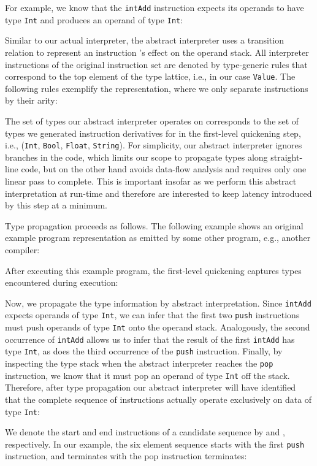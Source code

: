 \documentclass[preprint,10pt]{popl14conf}
\begin{document}
For example, we know that the \texttt{intAdd} instruction expects its operands to have type
\texttt{Int} and produces an operand of type \texttt{Int}:

Similar to our actual interpreter, the abstract interpreter uses a transition relation 
to represent an instruction 's effect on the operand stack.
All interpreter instructions of the original instruction set are denoted by type-generic rules that
correspond to the top element of the type lattice, i.e., in our case \texttt{Value}.
The following rules exemplify the representation, where we only separate instructions by their
arity:


The set of types our abstract interpreter operates on corresponds to the set of types we generated
instruction derivatives for in the first-level quickening step, i.e., (\texttt{Int}, \texttt{Bool},
\texttt{Float}, \texttt{String}).
For simplicity, our abstract interpreter ignores branches in the code, which limits our scope to
propagate types along straight-line code, but on the other hand avoids data-flow analysis and
requires only one linear pass to complete.
This is important insofar as we perform this abstract interpretation at run-time and therefore are
interested to keep latency introduced by this step at a minimum.

Type propagation proceeds as follows.
The following example shows an original example program representation as emitted by some other
program, e.g., another compiler:

After executing this example program, the first-level quickening captures types encountered during
execution:

Now, we propagate the type information by abstract interpretation.
Since \texttt{intAdd} expects operands of type \texttt{Int}, we can infer that the first two
\texttt{push} instructions must push operands of type \texttt{Int} onto the operand stack.
Analogously, the second occurrence of \texttt{intAdd} allows us to infer that the result of the
first \texttt{intAdd} has type \texttt{Int}, as does the third occurrence of the \texttt{push}
instruction.
Finally, by inspecting the type stack when the abstract interpreter reaches the \texttt{pop}
instruction, we know that it must pop an operand of type \texttt{Int} off the stack.
Therefore, after type propagation our abstract interpreter will have identified that the complete
sequence of instructions actually operate exclusively on data of type \texttt{Int}:

We denote the start and end instructions of a candidate sequence by  and , respectively.
In our example, the six element sequence starts with the first \texttt{push} instruction, and
terminates with the {pop} instruction terminates:
\end{document}
